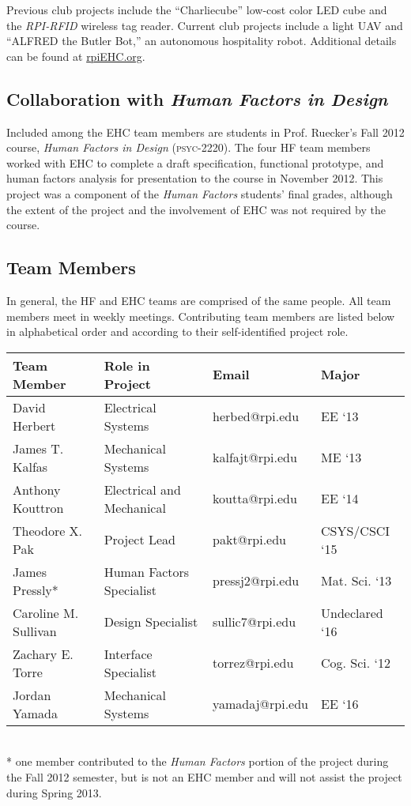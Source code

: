 \documentclass[12pt,oneside,final]{article}
\begin{document}
Previous club projects include the ``Charliecube'' low-cost color LED cube and the \emph{RPI-RFID} wireless tag reader. Current club projects include a light UAV and ``ALFRED the Butler Bot,'' an autonomous hospitality robot. Additional details can be found at \href{http://rpiEHC.org}{rpiEHC.org}.

\subsection{Collaboration with \emph{Human Factors in Design}}
Included among the EHC team members are students in Prof. Ruecker's Fall 2012 course, \emph{Human Factors in Design} (\textsc{psyc-2220}). The four HF team members worked with EHC to complete a draft specification, functional prototype, and human factors analysis for presentation to the course in November 2012. This project was a component of the \emph{Human Factors} students' final grades, although the extent of the project and the involvement of EHC was not required by the course.

\subsection{Team Members}
In general, the HF and EHC teams are comprised of the same people. All team members meet in weekly meetings. Contributing team members are listed below in alphabetical order and according to their self-identified project role. %

\begin{table}[h]
  \centering \small
  \begin{tabular}{l l l l }
    \hline
    Team Member           & Role in Project           & Email           & Major         \\
    \hline
    David Herbert         & Electrical Systems        & herbed@rpi.edu  & EE `13        \\
    James T. Kalfas       & Mechanical Systems        & kalfajt@rpi.edu & ME `13        \\
    Anthony Kouttron      & Electrical and Mechanical & koutta@rpi.edu  & EE `14        \\
    Theodore X. Pak       & Project Lead              & pakt@rpi.edu    & CSYS/CSCI `15 \\
    James Pressly*        & Human Factors Specialist  & pressj2@rpi.edu & Mat. Sci. `13 \\
    Caroline M. Sullivan  & Design Specialist         & sullic7@rpi.edu & Undeclared `16\\
    Zachary E. Torre      & Interface Specialist      & torrez@rpi.edu  & Cog. Sci. `12 \\
    Jordan Yamada         & Mechanical Systems        & yamadaj@rpi.edu & EE `16        \\
    \hline
  \end{tabular}\\
  * one member contributed to the \emph{Human Factors} portion of the project during the Fall 2012 semester, but is not an EHC member and will not assist the project during Spring 2013.
\end{table}
\end{document}
